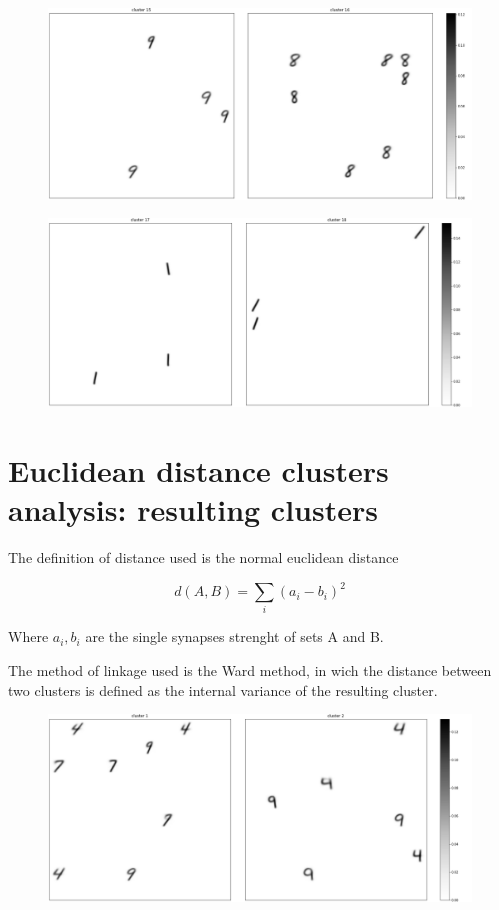\documentclass[a4paper]{report}
\begin{document}
\begin{figure} [H]
    \centering
    \includegraphics [width=\textwidth ] {c/h/15.png}
    \caption{}
\end{figure}

\begin{figure} [H]
    \centering
    \includegraphics [width=\textwidth ] {c/h/17.png}
    \caption{}
\end{figure}

\chapter{Euclidean distance clusters analysis: resulting clusters}

The definition of distance used is the normal euclidean distance

\begin{equation}
    d(A,B) = \sum_i (a_i - b_i)^2
\end{equation}

Where $a_i, b_i$ are the single synapses strenght of sets A and B.

The method of linkage used is the Ward method, in wich the distance between two clusters is defined as the internal variance of the resulting cluster.

\begin{figure} [H]
    \centering
    \includegraphics [width=\textwidth ] {c/e/1.png}
    \caption{}
\end{figure}
\end{document}
